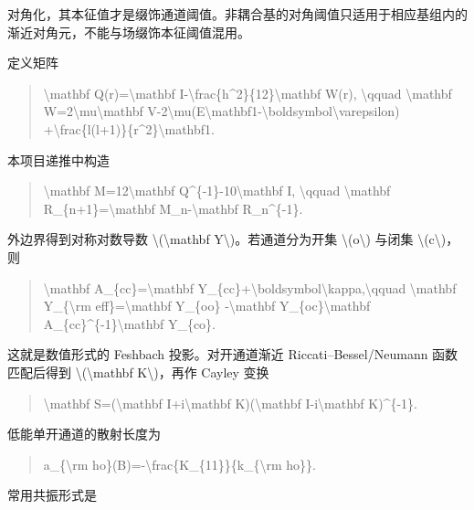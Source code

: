 \documentclass[UTF8,openany,11pt,fontset=fandol]{ctexbook}
\begin{document}
对角化，其本征值才是缀饰通道阈值。非耦合基的对角阈值只适用于相应基组内的渐近对角元，不能与场缀饰本征阈值混用。

定义矩阵

\begin{quote}
\textbackslash mathbf Q(r)=\textbackslash mathbf
I-\textbackslash frac\{h\^{}2\}\{12\}\textbackslash mathbf W(r),
\textbackslash qquad \textbackslash mathbf
W=2\textbackslash mu\textbackslash mathbf
V-2\textbackslash mu(E\textbackslash mathbf1-\textbackslash boldsymbol\textbackslash varepsilon)
+\textbackslash frac\{l(l+1)\}\{r\^{}2\}\textbackslash mathbf1.
\end{quote}

本项目递推中构造

\begin{quote}
\textbackslash mathbf M=12\textbackslash mathbf
Q\^{}\{-1\}-10\textbackslash mathbf I, \textbackslash qquad
\textbackslash mathbf R\_\{n+1\}=\textbackslash mathbf
M\_n-\textbackslash mathbf R\_n\^{}\{-1\}.
\end{quote}

外边界得到对称对数导数 \textbackslash(\textbackslash mathbf
Y\textbackslash)。若通道分为开集 \textbackslash(o\textbackslash) 与闭集
\textbackslash(c\textbackslash)，则

\begin{quote}
\textbackslash mathbf A\_\{cc\}=\textbackslash mathbf
Y\_\{cc\}+\textbackslash boldsymbol\textbackslash kappa,\textbackslash qquad
\textbackslash mathbf Y\_\{\textbackslash rm eff\}=\textbackslash mathbf
Y\_\{oo\} -\textbackslash mathbf Y\_\{oc\}\textbackslash mathbf
A\_\{cc\}\^{}\{-1\}\textbackslash mathbf Y\_\{co\}.
\end{quote}

这就是数值形式的 Feshbach 投影。对开通道渐近 Riccati--Bessel/Neumann
函数匹配后得到 \textbackslash(\textbackslash mathbf
K\textbackslash)，再作 Cayley 变换

\begin{quote}
\textbackslash mathbf S=(\textbackslash mathbf I+i\textbackslash mathbf
K)(\textbackslash mathbf I-i\textbackslash mathbf K)\^{}\{-1\}.
\end{quote}

低能单开通道的散射长度为

\begin{quote}
a\_\{\textbackslash rm
ho\}(B)=-\textbackslash frac\{K\_\{11\}\}\{k\_\{\textbackslash rm
ho\}\}.
\end{quote}

常用共振形式是
\end{document}
